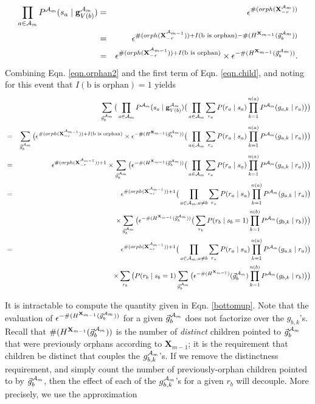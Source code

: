 \documentclass[11pt]{article}
\newcommand{\A}{{\cal A}}
\newcommand{\X}{\mathbf{X}}
\newcommand{\Xrm}{\X^{\Am}_{-r}}
\newcommand{\XrmPrev}{\X^{\A_{m-1}}_{-r}}
\newcommand{\Am}{\A_{m}}
\begin{document}
\begin{eqnarray}
\prod_{a \in {\Am}} P^{\Am}(s_a \mid \mathbf{g}^{\Am}_{V({b})}) &=& \epsilon^{\#(orph(\Xrm))} \\
%
&=&\epsilon^{\#(orph(\XrmPrev)) + I(\text{b is orphan}) - \#(H^{\X_{m-1}}(\vec{g}_b^{\Am}))} \\
%
&=& \epsilon^{\#(orph(\XrmPrev)) + I(\text{b is orphan})} \times \epsilon^{- \#(H^{\X_{m-1}}(\vec{g}_b^{\Am}))} \label{eqn.orphan2}.
\end{eqnarray}
%
Combining Eqn. \ref{eqn.orphan2} and the first term of Eqn. \ref{eqn.child}, and noting for this event that $ I(\text{b is orphan})=1$ yields
\begin{eqnarray}
& &\sum_{\vec{g}^{\Am}_{b}} \big( \prod_{a \in {\Am}} P^{\Am}(s_a \mid \mathbf{g}^{\Am}_{V({b})})  \big( \prod_{a \in {\A_{m}}} \sum_{r_a} P(r_a \mid s_a) \prod_{k=1}^{n(a)} P^{\Am}(g_{a,k} \mid r_a) \big) \big ) \\
%
&=& \sum_{\vec{g}^{\Am}_{b}} \big(\epsilon^{\#(orph(\XrmPrev)) + I(\text{b is orphan})} \times \epsilon^{- \#(H^{\X_{m-1}}(\vec{g}_b^{\Am}))}   \big( \prod_{a \in {\A_{m}}} \sum_{r_a} P(r_a \mid s_a) \prod_{k=1}^{n(a)} P^{\Am}(g_{a,k} \mid r_a) \big) \big) \\
%
&=& \epsilon^{\#(orph(\XrmPrev)) + 1} \times  \sum_{\vec{g}^{\Am}_{b}} \big( \epsilon^{- \#(H^{\X_{m-1}}(\vec{g}_b^{\Am}))}  \big( \prod_{a \in {\A_{m}}} \sum_{r_a} P(r_a \mid s_a) \prod_{k=1}^{n(a)} P^{\Am}(g_{a,k} \mid r_a) \big) \big) \\
%
&=& \epsilon^{\#(orph(\XrmPrev)) + 1} \big( \prod_{a \in {\A_{m}}, a \neq b} \sum_{r_a} P(r_a \mid s_a) \prod_{k=1}^{n(a)} P^{\Am}(g_{a,k} \mid r_a) \big) \\
& & \times \sum_{\vec{g}^{\Am}_{b}} \big( \epsilon^{- \#(H^{\X_{m-1}}(\vec{g}_b^{\Am}))} \big( \sum_{r_b} P(r_b \mid s_b = 1) \prod_{k=1}^{n(b)} P^{\Am}(g_{b,k} \mid r_b) \big) \big) \nonumber \\
%
&=& \epsilon^{\#(orph(\XrmPrev)) + 1} \big( \prod_{a \in {\A_{m}}, a \neq b} \sum_{r_a} P(r_a \mid s_a) \prod_{k=1}^{n(a)} P^{\Am}(g_{a,k} \mid r_a) \big) \label{bottomup} \\
& & \times \sum_{r_b} \big(P(r_b \mid s_b = 1) \sum_{\vec{g}^{\Am}_{b}} \big( \epsilon^{-\#(H^{\X_{m-1}})}(\vec{g}^{\Am}_b) \prod_{k=1}^{n(b)} P^{\Am}(g_{b,k} \mid r_b) \big) \big) \nonumber
\end{eqnarray} 

It is intractable to compute the quantity given in Eqn. \ref{bottomup}. Note that the evaluation of $\epsilon^{-\#(H^{\X_{m-1}}(\vec{g}^{\Am}_b))}$ for a given $\vec{g}^{\Am}_{b}$ does not factorize over the $g_{b,k}$'s. Recall that $\#(H^{\X_{m-1}}(\vec{g}^{\Am}_b))$ is the number of \emph{distinct} children pointed to $\vec{g}^{\Am}_b$ that were previously orphans according to $\X_{m-1}$; it is the requirement that children be distinct that couples the $g^{\Am}_{b,k}$'s. If we remove the distinctness requirement, and simply count the number of previously-orphan children pointed to by $\vec{g}^{\Am}_b$, then the effect of each of the $g^{\Am}_{b,k}$'s for a given $r_b$ will decouple. More precisely, we use the approximation
\end{document}
